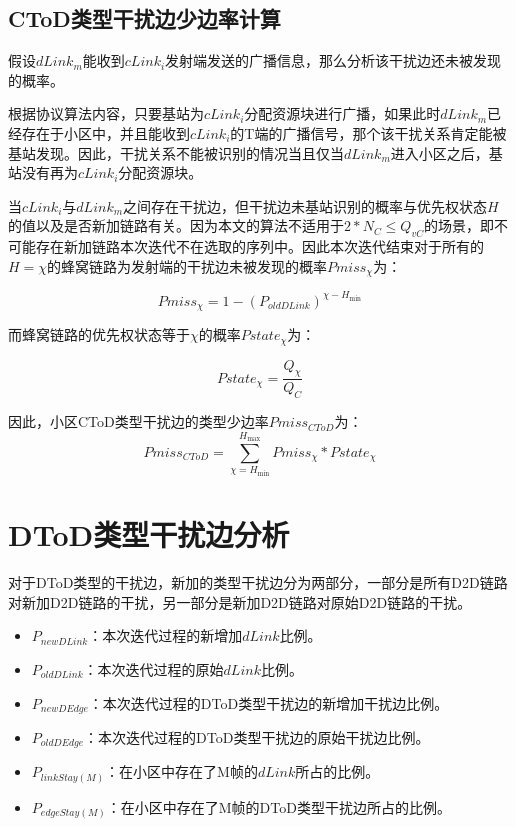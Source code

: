 \documentclass[figurelist,tablelist,algorithmlist,nomlist,masters]{seuthesix}
\begin{document}
	
	\subsection{CToD类型干扰边少边率计算}
	假设$dLink_m$能收到$cLink_i$发射端发送的广播信息，那么分析该干扰边还未被发现的概率。
	
	根据协议算法内容，只要基站为$cLink_i$分配资源块进行广播，如果此时$dLink_m$已经存在于小区中，并且能收到$cLink_i$的T端的广播信号，那个该干扰关系肯定能被基站发现。因此，干扰关系不能被识别的情况当且仅当$dLink_m$进入小区之后，基站没有再为$cLink_i$分配资源块。
	
	当$cLink_i$与$dLink_m$之间存在干扰边，但干扰边未基站识别的概率与优先权状态$H$的值以及是否新加链路有关。因为本文的算法不适用于$2*N_C \le Q_{vC}$的场景，即不可能存在新加链路本次迭代不在选取的序列中。因此本次迭代结束对于所有的$H = \chi $的蜂窝链路为发射端的干扰边未被发现的概率$Pmiss_{\chi }$为：
	
	\begin{equation}\label{eq3.1}
	Pmiss_{\chi } = 1 - {({P_{oldDLink}})^{\chi - H_{\min }}}
	\end{equation}
	
	而蜂窝链路的优先权状态等于$\chi $的概率$Pstate_{\chi }$为：
	
	\begin{equation}\label{eq3.1}
	Pstate_{\chi } = \frac{{Q_{\chi }}}{{Q_C}}
	\end{equation}
	
	因此，小区CToD类型干扰边的类型少边率$Pmiss_{CToD}$为：
	\begin{equation}\label{eq3.1}
	Pmiss_{CToD} = \sum\limits_{\chi = {H_{\min }}}^{{H_{\max }}} Pmiss_{\chi }*Pstate_{\chi }
	\end{equation}
	
	
	\section{DToD类型干扰边分析}
	对于DToD类型的干扰边，新加的类型干扰边分为两部分，一部分是所有D2D链路对新加D2D链路的干扰，另一部分是新加D2D链路对原始D2D链路的干扰。
	\begin{itemize}
		\item ${P_{newDLink}}$：本次迭代过程的新增加$dLink$比例。
		\item ${P_{oldDLink}}$：本次迭代过程的原始$dLink$比例。
		\item ${P_{newDEdge}}$：本次迭代过程的DToD类型干扰边的新增加干扰边比例。
		\item ${P_{oldDEdge}}$：本次迭代过程的DToD类型干扰边的原始干扰边比例。
		\item ${P_{linkStay(M)}}$：在小区中存在了M帧的$dLink$所占的比例。
		\item ${P_{edgeStay(M)}}$：在小区中存在了M帧的DToD类型干扰边所占的比例。
	\end{itemize}
	
\end{document}
